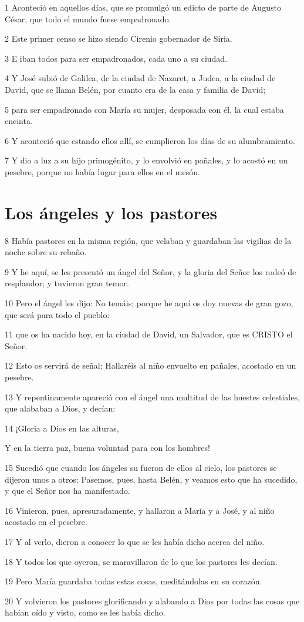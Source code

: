 \par 1 Aconteció en aquellos días, que se promulgó un edicto de parte de Augusto César, que todo el mundo fuese empadronado.
\par 2 Este primer censo se hizo siendo Cirenio gobernador de Siria.
\par 3 E iban todos para ser empadronados, cada uno a su ciudad.
\par 4 Y José subió de Galilea, de la ciudad de Nazaret, a Judea, a la ciudad de David, que se llama Belén, por cuanto era de la casa y familia de David;
\par 5 para ser empadronado con María su mujer, desposada con él, la cual estaba encinta.
\par 6 Y aconteció que estando ellos allí, se cumplieron los días de su alumbramiento.
\par 7 Y dio a luz a su hijo primogénito, y lo envolvió en pañales, y lo acostó en un pesebre, porque no había lugar para ellos en el mesón.

\section*{Los ángeles y los pastores}

\par 8 Había pastores en la misma región, que velaban y guardaban las vigilias de la noche sobre su rebaño.
\par 9 Y he aquí, se les presentó un ángel del Señor, y la gloria del Señor los rodeó de resplandor; y tuvieron gran temor.
\par 10 Pero el ángel les dijo: No temáis; porque he aquí os doy nuevas de gran gozo, que será para todo el pueblo:
\par 11 que os ha nacido hoy, en la ciudad de David, un Salvador, que es CRISTO el Señor.
\par 12 Esto os servirá de señal: Hallaréis al niño envuelto en pañales, acostado en un pesebre.
\par 13 Y repentinamente apareció con el ángel una multitud de las huestes celestiales, que alababan a Dios, y decían:
\par 14 ¡Gloria a Dios en las alturas,
\par Y en la tierra paz, buena voluntad para con los hombres!
\par 15 Sucedió que cuando los ángeles su fueron de ellos al cielo, los pastores se dijeron unos a otros: Pasemos, pues, hasta Belén, y veamos esto que ha sucedido, y que el Señor nos ha manifestado.
\par 16 Vinieron, pues, apresuradamente, y hallaron a María y a José, y al niño acostado en el pesebre.
\par 17 Y al verlo, dieron a conocer lo que se les había dicho acerca del niño.
\par 18 Y todos los que oyeron, se maravillaron de lo que los pastores les decían.
\par 19 Pero María guardaba todas estas cosas, meditándolas en su corazón.
\par 20 Y volvieron los pastores glorificando y alabando a Dios por todas las cosas que habían oído y visto, como se les había dicho.

